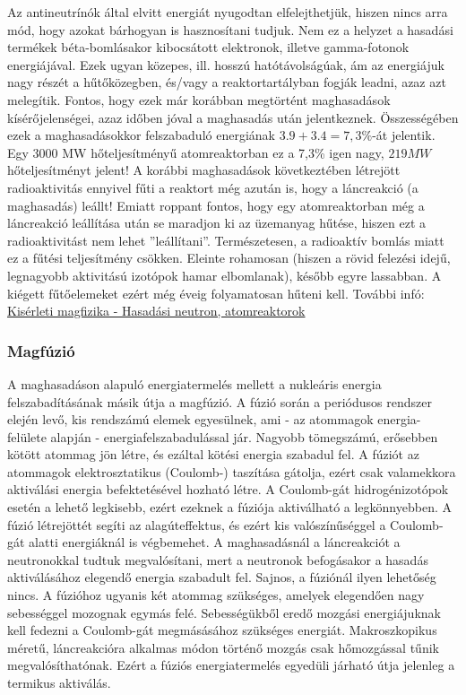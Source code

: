 \documentclass[../main.tex]{subfiles}
\begin{document}
Az antineutrínók által elvitt energiát nyugodtan elfelejthetjük, hiszen nincs arra mód,
hogy azokat bárhogyan is hasznosítani tudjuk. Nem ez a helyzet a hasadási termékek
béta-bomlásakor kibocsátott elektronok, illetve gamma-fotonok energiájával. Ezek ugyan
közepes, ill. hosszú hatótávolságúak, ám az energiájuk nagy részét a hűtőközegben,
és/vagy a reaktortartályban fogják leadni, azaz azt melegítik. Fontos, hogy ezek már korábban megtörtént maghasadások kísérőjelenségei, azaz időben jóval a maghasadás után
jelentkeznek. Összességében ezek a maghasadásokkor felszabaduló energiának $3.9+3.4 = 7,3\%$-át jelentik. Egy 3000 MW hőteljesítményű atomreaktorban ez a 7,3\% igen nagy,
$219 MW$ hőteljesítményt jelent! A korábbi maghasadások következtében létrejött radioaktivitás ennyivel fűti a reaktort még azután is, hogy a láncreakció (a maghasadás)
leállt! Emiatt roppant fontos, hogy egy atomreaktorban még a láncreakció leállítása után
se maradjon ki az üzemanyag hűtése, hiszen ezt a radioaktivitást nem lehet ”leállítani”.
Természetesen, a radioaktív bomlás miatt ez a fűtési teljesítmény csökken. Eleinte rohamosan (hiszen a rövid felezési idejű, legnagyobb aktivitású izotópok hamar elbomlanak),
később egyre lassabban. A kiégett fűtőelemeket ezért még éveig folyamatosan hűteni kell.
\newline
\newline
További infó: \href{https://mek.oszk.hu/16000/16052/16052.pdf#section.8.2}{Kisérleti magfizika - Hasadási neutron, atomreaktorok}

\subsubsection{Magfúzió}
A maghasadáson alapuló energiatermelés mellett a nukleáris energia felszabadításának
másik útja a magfúzió. A fúzió során a periódusos rendszer elején levő, kis rendszámú
elemek egyesülnek, ami - az atommagok energia-felülete alapján - 
energiafelszabadulással jár. Nagyobb tömegszámú, erősebben kötött atommag jön létre,
és ezáltal kötési energia szabadul fel. A fúziót az atommagok elektrosztatikus (Coulomb-)
taszítása gátolja, ezért csak valamekkora aktiválási energia befektetésével hozható létre.
A Coulomb-gát hidrogénizotópok esetén a lehető legkisebb, ezért ezeknek a fúziója
aktiválható a legkönnyebben. A fúzió létrejöttét segíti az alagúteffektus, és ezért kis valószínűséggel a Coulomb-gát alatti energiáknál is végbemehet.
A maghasadásnál a láncreakciót a neutronokkal tudtuk megvalósítani, mert a neutronok befogásakor a hasadás aktiválásához elegendő energia szabadult fel. Sajnos, a
fúziónál ilyen lehetőség nincs. A fúzióhoz ugyanis két atommag szükséges, amelyek elegendően nagy sebességgel mozognak egymás felé. Sebességükből eredő mozgási energiájuknak kell fedezni a Coulomb-gát megmásásához szükséges energiát. Makroszkopikus
méretű, láncreakcióra alkalmas módon történő mozgás csak hőmozgással tűnik megvalósíthatónak. Ezért a fúziós energiatermelés egyedüli járható útja jelenleg a termikus
aktiválás.
\end{document}

